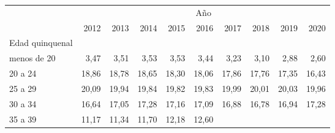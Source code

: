 \begin{tabular}{llllllllll}
\cline{1-10}
\multicolumn{1}{c}{} &
  \multicolumn{9}{|c}{Año} \\
\multicolumn{1}{c}{} &
  \multicolumn{1}{|r}{2012} &
  \multicolumn{1}{r}{2013} &
  \multicolumn{1}{r}{2014} &
  \multicolumn{1}{r}{2015} &
  \multicolumn{1}{r}{2016} &
  \multicolumn{1}{r}{2017} &
  \multicolumn{1}{r}{2018} &
  \multicolumn{1}{r}{2019} &
  \multicolumn{1}{r}{2020} \\
\cline{1-10}
\multicolumn{1}{l}{Edad quinquenal} &
  \multicolumn{1}{|r}{} &
  \multicolumn{1}{r}{} &
  \multicolumn{1}{r}{} &
  \multicolumn{1}{r}{} &
  \multicolumn{1}{r}{} &
  \multicolumn{1}{r}{} &
  \multicolumn{1}{r}{} &
  \multicolumn{1}{r}{} &
  \multicolumn{1}{r}{} \\
\multicolumn{1}{l}{\hspace{1em}menos de 20} &
  \multicolumn{1}{|r}{3,47} &
  \multicolumn{1}{r}{3,51} &
  \multicolumn{1}{r}{3,53} &
  \multicolumn{1}{r}{3,53} &
  \multicolumn{1}{r}{3,44} &
  \multicolumn{1}{r}{3,23} &
  \multicolumn{1}{r}{3,10} &
  \multicolumn{1}{r}{2,88} &
  \multicolumn{1}{r}{2,60} \\
\multicolumn{1}{l}{\hspace{1em}20 a 24} &
  \multicolumn{1}{|r}{18,86} &
  \multicolumn{1}{r}{18,78} &
  \multicolumn{1}{r}{18,65} &
  \multicolumn{1}{r}{18,30} &
  \multicolumn{1}{r}{18,06} &
  \multicolumn{1}{r}{17,86} &
  \multicolumn{1}{r}{17,76} &
  \multicolumn{1}{r}{17,35} &
  \multicolumn{1}{r}{16,43} \\
\multicolumn{1}{l}{\hspace{1em}25 a 29} &
  \multicolumn{1}{|r}{20,09} &
  \multicolumn{1}{r}{19,94} &
  \multicolumn{1}{r}{19,84} &
  \multicolumn{1}{r}{19,82} &
  \multicolumn{1}{r}{19,83} &
  \multicolumn{1}{r}{19,99} &
  \multicolumn{1}{r}{20,01} &
  \multicolumn{1}{r}{20,03} &
  \multicolumn{1}{r}{19,96} \\
\multicolumn{1}{l}{\hspace{1em}30 a 34} &
  \multicolumn{1}{|r}{16,64} &
  \multicolumn{1}{r}{17,05} &
  \multicolumn{1}{r}{17,28} &
  \multicolumn{1}{r}{17,16} &
  \multicolumn{1}{r}{17,09} &
  \multicolumn{1}{r}{16,88} &
  \multicolumn{1}{r}{16,78} &
  \multicolumn{1}{r}{16,94} &
  \multicolumn{1}{r}{17,28} \\
\multicolumn{1}{l}{\hspace{1em}35 a 39} &
  \multicolumn{1}{|r}{11,17} &
  \multicolumn{1}{r}{11,34} &
  \multicolumn{1}{r}{11,70} &
  \multicolumn{1}{r}{12,18} &
  \multicolumn{1}{r}{12,60} &

\end{tabular}
